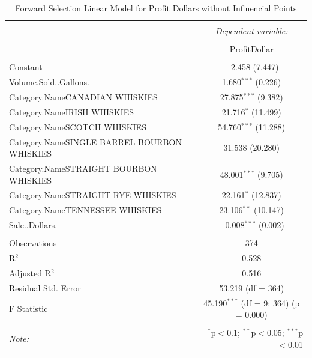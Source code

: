 \documentclass[]{elsarticle} %
\begin{document}
\begin{table}[!htbp] \centering 
  \caption{Forward Selection Linear Model for Profit Dollars without Influencial Points} 
  \label{} 
\normalsize 
\begin{tabular}{@{\extracolsep{5pt}}lc} 
\\[-1.8ex]\hline 
\hline \\[-1.8ex] 
 & \multicolumn{1}{c}{\textit{Dependent variable:}} \\ 
\cline{2-2} 
\\[-1.8ex] & ProfitDollar \\ 
\hline \\[-1.8ex] 
 Constant & $-$2.458 (7.447) \\ 
  Volume.Sold..Gallons. & 1.680$^{***}$ (0.226) \\ 
  Category.NameCANADIAN WHISKIES & 27.875$^{***}$ (9.382) \\ 
  Category.NameIRISH WHISKIES & 21.716$^{*}$ (11.499) \\ 
  Category.NameSCOTCH WHISKIES & 54.760$^{***}$ (11.288) \\ 
  Category.NameSINGLE BARREL BOURBON WHISKIES & 31.538 (20.280) \\ 
  Category.NameSTRAIGHT BOURBON WHISKIES & 48.001$^{***}$ (9.705) \\ 
  Category.NameSTRAIGHT RYE WHISKIES & 22.161$^{*}$ (12.837) \\ 
  Category.NameTENNESSEE WHISKIES & 23.106$^{**}$ (10.147) \\ 
  Sale..Dollars. & $-$0.008$^{***}$ (0.002) \\ 
 \hline \\[-1.8ex] 
Observations & 374 \\ 
R$^{2}$ & 0.528 \\ 
Adjusted R$^{2}$ & 0.516 \\ 
Residual Std. Error & 53.219 (df = 364) \\ 
F Statistic & 45.190$^{***}$ (df = 9; 364)  (p = 0.000) \\ 
\hline 
\hline \\[-1.8ex] 
\textit{Note:}  & \multicolumn{1}{r}{$^{*}$p$<$0.1; $^{**}$p$<$0.05; $^{***}$p$<$0.01} \\ 
\end{tabular} 
\end{table}
\end{document}
